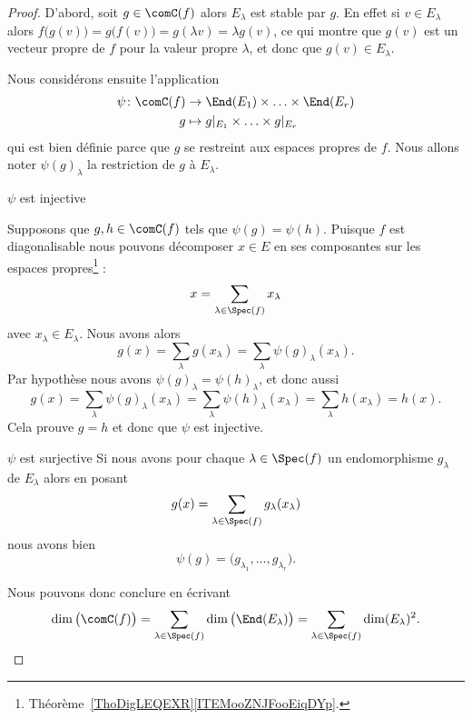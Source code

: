 \begin{proof}
	D'abord, soit \( g\in\comC(f)\) alors \( E_{\lambda}\) est stable par \( g\). En effet si \( v\in E_{\lambda}\) alors \( f\big( g(v) \big)=g\big( f(v) \big)=g(\lambda v)=\lambda g(v)\), ce qui montre que \( g(v)\) est un vecteur propre de \( f\) pour la valeur propre \( \lambda\), et donc que \( g(v)\in E_{\lambda}\).

	Nous considérons ensuite l'application
	\begin{equation}
		\begin{aligned}
			\psi\colon \comC(f) & \to \End(E_1)\times \ldots\times \End(E_r)    \\
			g                   & \mapsto  g|_{E_1}\times \ldots\times g|_{E_r}
		\end{aligned}
	\end{equation}
	qui est bien définie parce que \( g\) se restreint aux espaces propres de \( f\). Nous allons noter \( \psi(g)_{\lambda}\) la restriction de \( g\) à \( E_{\lambda}\).
	\begin{subproof}
		\item[\( \psi\) est injective]

		Supposons que \( g,h\in\comC(f)\) tels que \( \psi(g)=\psi(h)\). Puisque \( f\) est diagonalisable nous pouvons décomposer \( x\in  E\) en ses composantes sur les espaces propres\footnote{Théorème~\ref{ThoDigLEQEXR}\ref{ITEMooZNJFooEiqDYp}.} :
		\begin{equation}
			x=\sum_{\lambda\in\Spec(f)}x_{\lambda}
		\end{equation}
		avec \( x_{\lambda}\in E_{\lambda}\).  Nous avons alors
		\begin{equation}
			g(x)=\sum_{\lambda}g(x_{\lambda})=\sum_{\lambda}\psi(g)_{\lambda}(x_{\lambda}).
		\end{equation}
		Par hypothèse nous avons \( \psi(g)_{\lambda}=\psi(h)_{\lambda}\), et donc aussi
		\begin{equation}
			g(x)=\sum_{\lambda}\psi(g)_{\lambda}(x_{\lambda})=\sum_{\lambda}\psi(h)_{\lambda}(x_{\lambda})=\sum_{\lambda}h(x_{\lambda})=h(x).
		\end{equation}
		Cela prouve \( g=h\) et donc que \( \psi\) est injective.
		\item[\( \psi\) est surjective]
		Si nous avons pour chaque \( \lambda\in\Spec(f)\) un endomorphisme \( g_{\lambda}\) de \( E_{\lambda}\) alors en posant
		\begin{equation}
			g(x)=\sum_{\lambda\in\Spec(f)}g_{\lambda}(x_{\lambda})
		\end{equation}
		nous avons bien
		\begin{equation}
			\psi(g)=\big( g_{\lambda_1},\ldots, g_{\lambda_r} \big).
		\end{equation}
	\end{subproof}
	Nous pouvons donc conclure en écrivant
	\begin{equation}
		\dim\big( \comC(f) \big)=\sum_{\lambda\in\Spec(f)}\dim\big( \End(E_{\lambda}) \big)= \sum_{\lambda\in\Spec(f)}\dim(E_{\lambda})^2.
	\end{equation}
\end{proof}

